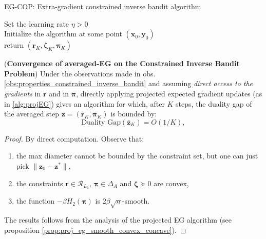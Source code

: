 \begin{algorithm}
    \SetAlgoLined
  \small
    \caption{EG-COP: Extra-gradient constrained inverse bandit algorithm}
    \label{alg:eg-cop}
      Set the learning rate $\eta >0$ \\
      Initialize the algorithm at some point $(\bm{x}_0,\bm{y}_0)$  \\
      return $(\bm{r}_K,\bm{\zeta}_K,\bm{\pi}_K)$
  \end{algorithm}
  

\begin{proposition}
    (\textbf{Convergence of averaged-EG on the Constrained Inverse Bandit Problem})
    Under the observations made in obs. \ref{obs:properties_constrained_inverse_bandit} and assuming \textit{direct access to the gradients} in $\bm{r}$ and in $\bm{\pi}$, directly applying projected expected gradient updates (as in \ref{alg:projEG}) gives an algorithm for which, after $K$ steps, the duality gap of the averaged step $\bar{\bm{z}}=(\bar{\bm{r}}_K,\bar{\bm{\pi}}_K) $ is bounded by:
    \[ 
        \text{Duality Gap}(\bar{\bm{z}}_K) = O(1/{K}),
    \]
\end{proposition}
\begin{proof}
    By direct computation. Observe that:
    \begin{enumerate}
        \item the max diameter cannot be bounded by the constraint set, but one can just pick $\|\bm{z}_0-\bm{z}^*\|$,
        \item the constraints $\bm{r} \in \mathcal{R}_{L_1}$, $\bm{\pi} \in \Delta_A$ and $\bm{\zeta} \succcurlyeq 0$ are convex,
        \item the function $-\beta H_2(\bm{\pi})$ is $2 \beta \sqrt{n}$-smooth.
    \end{enumerate}
    The results follows from the analysis of the projected EG algorithm (see proposition \ref{prop:proj_eg_smooth_convex_concave}).
\end{proof}
